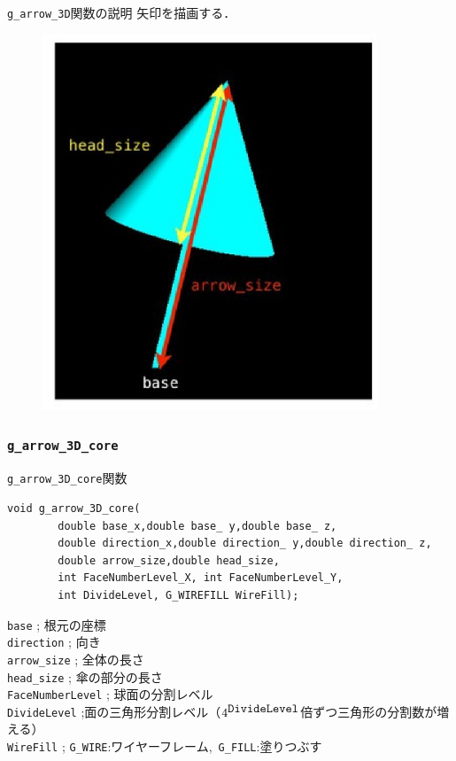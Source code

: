 \documentclass[a4paper,12pt]{jsarticle}%
\begin{document}
\begin{itembox}[l]{\texttt{g\_arrow\_3D}関数の説明}
矢印を描画する．
\end{itembox}
\begin{figure}[htb]
	\includegraphics[width=100mm]{./Figures/eps/Canvas_g_arrow.eps}
\end{figure}



\clearpage
\subsubsection{\texttt{g\_arrow\_3D\_core}}

\begin{itembox}[l]{\texttt{g\_arrow\_3D\_core}関数}
\begin{verbatim}
void g_arrow_3D_core(
        double base_x,double base_ y,double base_ z,
        double direction_x,double direction_ y,double direction_ z,
        double arrow_size,double head_size, 
        int FaceNumberLevel_X, int FaceNumberLevel_Y,
        int DivideLevel, G_WIREFILL WireFill);
\end{verbatim}
\verb|base| ; 根元の座標\\
\verb|direction| ; 向き\\
\verb|arrow_size| ; 全体の長さ\\
\verb|head_size| ; 傘の部分の長さ\\
\verb|FaceNumberLevel| ; 球面の分割レベル\\
\verb|DivideLevel| ;面の三角形分割レベル（$4^{\verb|DivideLevel|}$倍ずつ三角形の分割数が増える）\\
\verb|WireFill| ; \verb|G_WIRE|:ワイヤーフレーム,\ \verb|G_FILL|:塗りつぶす \\
\end{itembox}
\end{document}
